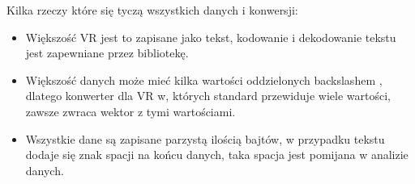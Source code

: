 \par
Kilka rzeczy które się tyczą wszystkich danych i konwersji:
\begin{itemize}
    \item Większość VR jest to zapisane jako tekst, kodowanie i dekodowanie tekstu jest zapewniane przez bibliotekę.
    \item Większość danych może mieć kilka wartości oddzielonych backslashem \quotett{\textbackslash}, dlatego konwerter dla VR w, których standard przewiduje wiele wartości, zawsze zwraca wektor z tymi wartościami.
    \item Wszystkie dane są zapisane parzystą ilością bajtów, w przypadku tekstu dodaje się znak spacji na końcu danych, taka spacja jest pomijana w analizie danych.
\end{itemize}

